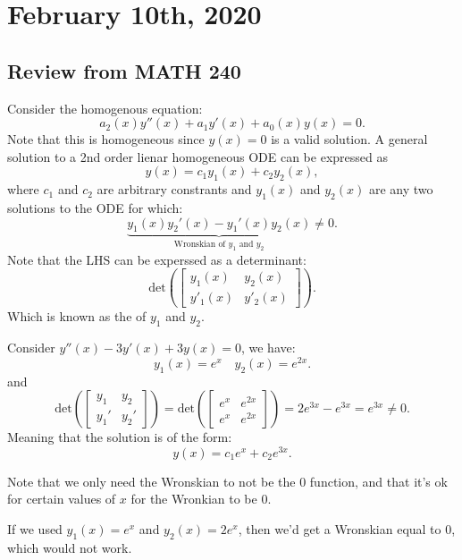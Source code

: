 \documentclass[../main/main.tex]{subfiles}
\begin{document}
\section{February 10th, 2020}
\subsection{Review from MATH 240}
Consider the homogenous equation: \[
	a_2(x)y''(x) + a_1y'(x)+a_0(x)y(x)=0
.\] Note that this is homogeneous since $y(x) = 0$ is a valid solution. A general solution to a 2nd order lienar homogeneous ODE can be expressed as \[
y(x) = c_1y_1(x) + c_2y_2(x)
,\]  where $c_1$ and $c_2$ are arbitrary constrants and $y_1(x)$ and $y_2(x)$ are any two solutions to the ODE for which: \[
\underbrace{y_1(x) y_2'(x)-y_1'(x)y_2(x)}_{\text{Wronskian of $y_1$ and $y_2$}}\neq 0
.\] Note that the LHS can be experssed as a determinant: \[
\text{det}\left(\begin{bmatrix} y_1(x)&y_2(x)\\y'_1(x)&y'_2(x) \end{bmatrix} \right)
.\] Which is known as the  of $y_1$ and $y_2$.
\begin{example} \label{coneq}
	Consider $y''(x)-3y'(x)+3y(x)=0$, we have:  \[
		y_1(x)=e^{x}\quad y_2(x) = e^{2x}
	.\] and \[
	\text{det}\left( \begin{bmatrix} y_1&y_2\\y_1'&y_2' \end{bmatrix}  \right) = \text{det}\left( \begin{bmatrix} e^{x}&e^{2x}\\e^{x}&e^{2x} \end{bmatrix}  \right) = 2e^{3x}-e^{3x}=e^{3x}\neq 0
	.\] Meaning that the solution is of the form: \[
	y(x) = c_1e^{x}+c_2e^{3x}
	.\] 
\end{example}
\begin{remark}
	Note that we only need the Wronskian to not be the 0 function, and that it's ok for certain values of $x$ for the Wronkian to be 0.
\end{remark}
\begin{example}
	If we used $y_1(x)=e^{x}$ and $y_2(x)=2e^{x}$, then we'd get a Wronskian equal to 0, which would not work.
\end{example}
\end{document}
